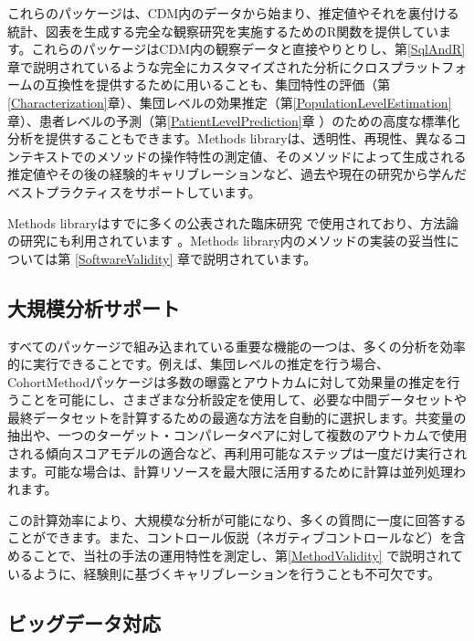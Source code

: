 \documentclass[
  11pt]{book}
\theoremstyle{definition}
\theoremstyle{definition}
\theoremstyle{definition}
\theoremstyle{definition}
\theoremstyle{remark}
\begin{document}
これらのパッケージは、CDM内のデータから始まり、推定値やそれを裏付ける統計、図表を生成する完全な観察研究を実施するためのR関数を提供しています。これらのパッケージはCDM内の観察データと直接やりとりし、第\ref{SqlAndR}章で説明されているような完全にカスタマイズされた分析にクロスプラットフォームの互換性を提供するために用いることも、集団特性の評価（第\ref{Characterization}章）、集団レベルの効果推定（第\ref{PopulationLevelEstimation}章）、患者レベルの予測（第\ref{PatientLevelPrediction}章 ）のための高度な標準化分析を提供することもできます。Methods libraryは、透明性、再現性、異なるコンテキストでのメソッドの操作特性の測定値、そのメソッドによって生成される推定値やその後の経験的キャリブレーションなど、過去や現在の研究から学んだベストプラクティスをサポートしています。

Methods libraryはすでに多くの公表された臨床研究 \citep{boland_2017, duke_2017, ramcharran_2017, weinstein_2017, wang_2017, ryan_2017, ryan_2018, vashisht_2018, yuan_2018, johnston_2019} で使用されており、方法論の研究にも利用されています \citep{schuemie_2014, schuemie_2016, reps2018, tian_2018, schuemie_2018, schuemie_2018b, reps_2019}。Methods library内のメソッドの実装の妥当性については第 \ref{SoftwareValidity} 章で説明されています。

\subsection{大規模分析サポート}\label{ux5927ux898fux6a21ux5206ux6790ux30b5ux30ddux30fcux30c8}

すべてのパッケージで組み込まれている重要な機能の一つは、多くの分析を効率的に実行できることです。例えば、集団レベルの推定を行う場合、CohortMethodパッケージは多数の曝露とアウトカムに対して効果量の推定を行うことを可能にし、さまざまな分析設定を使用して、必要な中間データセットや最終データセットを計算するための最適な方法を自動的に選択します。共変量の抽出や、一つのターゲット・コンパレータペアに対して複数のアウトカムで使用される傾向スコアモデルの適合など、再利用可能なステップは一度だけ実行されます。可能な場合は、計算リソースを最大限に活用するために計算は並列処理われます。

この計算効率により、大規模な分析が可能になり、多くの質問に一度に回答することができます。また、コントロール仮説（ネガティブコントロールなど）を含めることで、当社の手法の運用特性を測定し、第\ref{MethodValidity} で説明されているように、経験則に基づくキャリブレーションを行うことも不可欠です。 

\subsection{ビッグデータ対応}\label{BigDataSupport}
\end{document}
